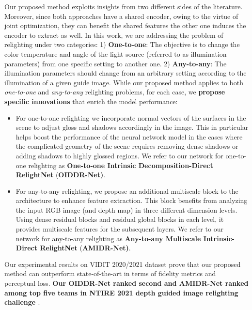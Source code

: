\documentclass[final]{cvpr}
\begin{document}
Our proposed method exploits insights from two different sides of the literature. Moreover, since both approaches have a shared encoder, owing to the virtue of joint optimization, they can benefit the shared features the other one induces the encoder to extract as well. In this work, we are addressing the problem of relighting under two categories: 
1) \textbf{One-to-one}: The objective is to change the color temperature and angle of the light source (referred to as illumination parameters) from one specific setting to another one. 
2) \textbf{Any-to-any}: The illumination parameters should change from an arbitrary setting according to the illumination of a given guide image. While our proposed method applies to both \textit{one-to-one} and \textit{any-to-any} relighting problems, for each case, we {\textbf {propose specific innovations}} that enrich the model performance:
\begin{itemize}
    \item  For one-to-one relighting we incorporate normal vectors of the surfaces in the scene to adjust gloss and shadows accordingly in the image. This in particular helps boost the performance of the neural network model in the cases where the complicated geometry of the scene requires removing dense shadows or adding shadows to highly glossed regions. We refer to our network for one-to-one relighting as \textbf{One-to-one Intrinsic Decomposition-Direct RelightNet} (\textbf{OIDDR-Net)}.
    \item For any-to-any relighting, we propose an additional multiscale block to the architecture to enhance feature extraction. This block benefits from analyzing the input RGB image (and depth map) in three different dimension levels. Using dense residual blocks and residual global blocks in each level, it provides multiscale features for the subsequent layers. We refer to our network for any-to-any relighting as \textbf{Any-to-any Multiscale Intrinsic-Direct RelightNet} (\textbf{AMIDR-Net)}.
\end{itemize}
Our experimental results on VIDIT 2020/2021 dataset prove that our proposed method can outperform state-of-the-art in terms of fidelity metrics and perceptual loss. \textbf{Our OIDDR-Net ranked second and AMIDR-Net ranked among top five teams in NTIRE 2021 depth guided image relighting challenge \cite{59}}.
\end{document}
